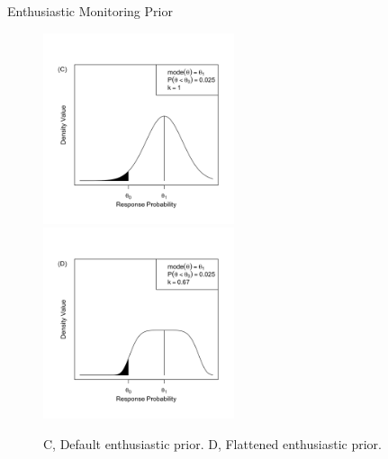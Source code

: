 \documentclass{beamer}
\begin{document}
\begin{frame}{Enthusiastic Monitoring Prior}
\begin{figure}[htbp]
\begin{center}
\includegraphics[width=0.5\textwidth]{./figures/figure1c.png}%
\includegraphics[width=0.5\textwidth]{./figures/figure1d.png}
\caption{C, Default enthusiastic prior. D, Flattened enthusiastic prior.}

\label{fig:figure1}
\end{center}
\end{figure}
\end{frame}
\end{document}
